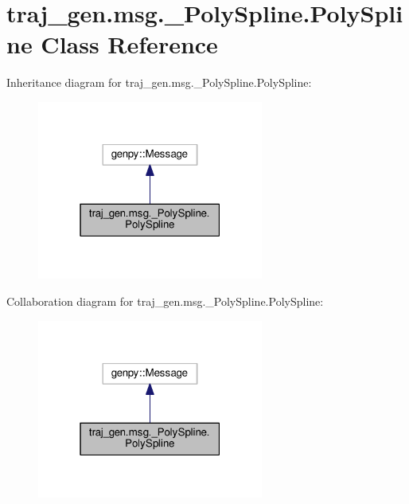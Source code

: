 \hypertarget{classtraj__gen_1_1msg_1_1___poly_spline_1_1_poly_spline}{}\section{traj\+\_\+gen.\+msg.\+\_\+\+Poly\+Spline.\+Poly\+Spline Class Reference}
\label{classtraj__gen_1_1msg_1_1___poly_spline_1_1_poly_spline}


Inheritance diagram for traj\+\_\+gen.\+msg.\+\_\+\+Poly\+Spline.\+Poly\+Spline\+:
\nopagebreak
\begin{figure}[H]
\begin{center}
\leavevmode
\includegraphics[width=211pt]{classtraj__gen_1_1msg_1_1___poly_spline_1_1_poly_spline__inherit__graph}
\end{center}
\end{figure}


Collaboration diagram for traj\+\_\+gen.\+msg.\+\_\+\+Poly\+Spline.\+Poly\+Spline\+:
\nopagebreak
\begin{figure}[H]
\begin{center}
\leavevmode
\includegraphics[width=211pt]{classtraj__gen_1_1msg_1_1___poly_spline_1_1_poly_spline__coll__graph}
\end{center}
\end{figure}
